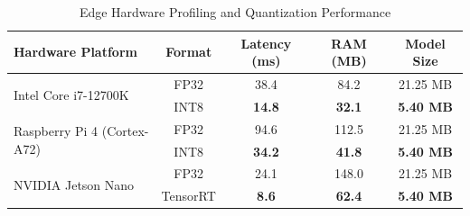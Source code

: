 \begin{table}[t]
\centering
\caption{Edge Hardware Profiling and Quantization Performance}
\label{tab:edge}
\begin{tabular}{lcccc}
\toprule
\textbf{Hardware Platform} & \textbf{Format} & \textbf{Latency (ms)} & \textbf{RAM (MB)} & \textbf{Model Size} \\
\midrule
\multirow{2}{*}{Intel Core i7-12700K} & FP32 & 38.4 & 84.2 & 21.25 MB \\
 & INT8 & \textbf{14.8} & \textbf{32.1} & \textbf{5.40 MB} \\
\midrule
\multirow{2}{*}{Raspberry Pi 4 (Cortex-A72)} & FP32 & 94.6 & 112.5 & 21.25 MB \\
 & INT8 & \textbf{34.2} & \textbf{41.8} & \textbf{5.40 MB} \\
\midrule
\multirow{2}{*}{NVIDIA Jetson Nano} & FP32 & 24.1 & 148.0 & 21.25 MB \\
 & TensorRT & \textbf{8.6} & \textbf{62.4} & \textbf{5.40 MB} \\
\bottomrule
\end{tabular}
\end{table}

